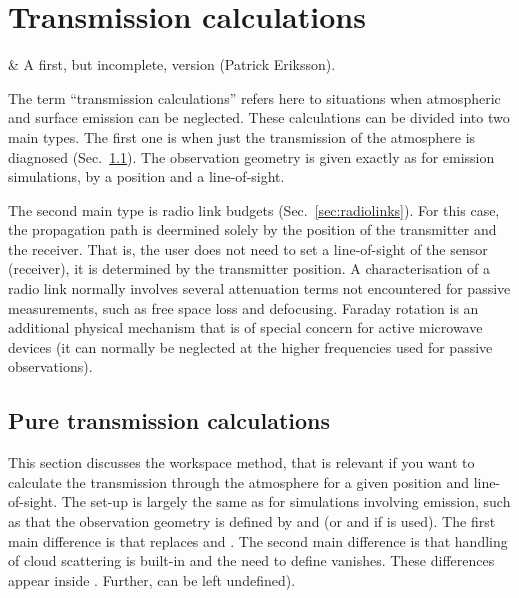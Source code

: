 \chapter{Transmission calculations}
 \label{sec:trans}


 & A first, but incomplete, version (Patrick Eriksson).\\
\stophistory

The term ``transmission calculations'' refers here to situations when
atmospheric and surface emission can be neglected. These calculations can be
divided into two main types. The first one is when just the transmission of the
atmosphere is diagnosed (Sec.~\ref{sec:transmission}). The observation geometry
is given exactly as for emission simulations, by a position and a
line-of-sight.

The second main type is radio link budgets (Sec.~\ref{sec:radiolinks}). For
this case, the propagation path is deermined solely by the position of the
transmitter and the receiver. That is, the user does not need to set a
line-of-sight of the sensor (receiver), it is determined by the transmitter
position. A characterisation of a radio link normally involves several
attenuation terms not encountered for passive measurements, such as free space
loss and defocusing. Faraday rotation is an additional physical mechanism that
is of special concern for active microwave devices (it can normally be
neglected at the higher frequencies used for passive observations).




\section{Pure transmission calculations}
\label{sec:transmission}

This section discusses the  workspace method,
that is relevant if you want to calculate the transmission through the
atmosphere for a given position and line-of-sight. The set-up is largely the
same as for simulations involving emission, such as that the observation
geometry is defined by  and  (or
 and  if  is used).
The first main difference is that  replaces
 and . The second
main difference is that handling of cloud scattering is built-in and the need
to define  vanishes. These differences appear
inside . Further,
 can be left undefined).

